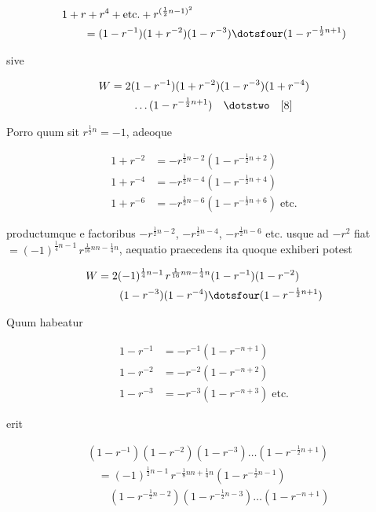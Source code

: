 \[
\begin{aligned}
&1+r+r^4+\text{etc.}+r^{(\frac12n-1)^2}\\&\qquad=(1-r^{-1})(1+r^{-2})(1-r^{-3})\dotsfour(1-r^{-\frac12n+1})
\end{aligned}
\]


sive

\[
\begin{aligned}
W&=2(1-r^{-1})(1+r^{-2})(1-r^{-3})(1+r^{-4})\\&\qquad\ldots(1-r^{-\frac12n+1})\quad\dotstwo\quad[8]
\end{aligned}
\]

Porro quum sit $r^{\frac12n}=-1$, adeoque

\[
\begin{aligned}
1+r^{-2}&=-r^{\frac12n-2}(1-r^{-\frac12n+2})\\
1+r^{-4}&=-r^{\frac12n-4}(1-r^{-\frac12n+4})\\
1+r^{-6}&=-r^{\frac12n-6}(1-r^{-\frac12n+6})\;\text{etc.}
\end{aligned}
\]

productumque e factoribus $-r^{\frac12n-2}$, $-r^{\frac12n-4}$, $-r^{\frac12n-6}$ etc. usque ad $-r^2$ fiat $=(-1)^{\frac14n-1}\,r^{\frac1{16}nn-\frac14n}$, aequatio praecedens ita quoque exhiberi potest

\[
\begin{aligned}
W&=2(-1)^{\frac14n-1}\,r^{\frac1{16}nn-\frac14n}(1-r^{-1})(1-r^{-2})\\&\qquad(1-r^{-3})(1-r^{-4})\dotsfour(1-r^{-\frac12n+1})
\end{aligned}
\]

Quum habeatur

\[
\begin{aligned}
1-r^{-1}&=-r^{-1}(1-r^{-n+1})\\
1-r^{-2}&=-r^{-2}(1-r^{-n+2})\\
1-r^{-3}&=-r^{-3}(1-r^{-n+3})\;\text{etc.}
\end{aligned}
\]

erit

\[
\begin{aligned}
&(1-r^{-1})(1-r^{-2})(1-r^{-3})\ldots(1-r^{-\frac12n+1})\\
&\quad=(-1)^{\frac12n-1}\,r^{-\frac18nn+\frac14n}(1-r^{-\frac12n-1})\\&\qquad(1-r^{-\frac12n-2})(1-r^{-\frac12n-3})\ldots(1-r^{-n+1})
\end{aligned}
\]

